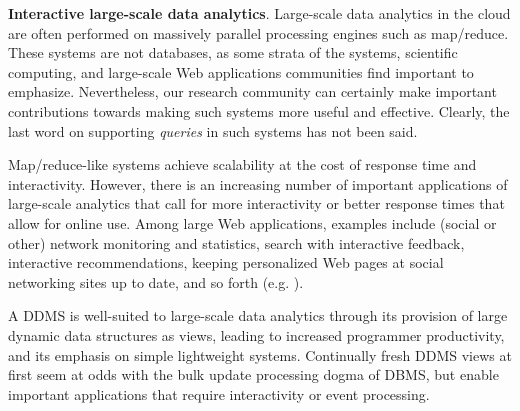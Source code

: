 {\bf Interactive large-scale data analytics}\/.
%
Large-scale data analytics in the cloud are often performed on massively
parallel processing engines such as map/reduce. These systems are not
databases, as some strata of the systems, scientific computing, and large-scale
Web applications communities find important to emphasize. Nevertheless, our
research community can certainly make important contributions towards making
such systems more useful and effective. Clearly, the last word on supporting
{\em queries}\/ in such systems has not been said.



Map/reduce-like systems achieve scalability at the cost of response time and
interactivity.
%
%
However, there is an increasing number of important applications of large-scale
analytics that call for more interactivity or better response times that allow
for online use. Among large Web applications, examples include (social or other)
network monitoring and statistics, search with interactive feedback, interactive
recommendations, keeping personalized Web pages at social networking sites up to
date, and so forth (e.g. \cite{olston-cidr:09,bast-cidr:07}).

%

A DDMS is well-suited to large-scale data analytics through its provision of
large dynamic data structures as views, leading to increased programmer
productivity, and its emphasis on simple lightweight systems. Continually fresh
DDMS views at first seem at odds with the bulk update processing dogma of DBMS,
but enable important applications that require interactivity or event
processing.







